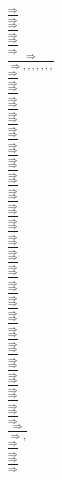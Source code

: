 \documentclass[11pt]{article}
\begin{document}
\begin{center}
\\$\frac{\Rightarrow }{\Rightarrow }$
\bigskip
\\$\frac{\Rightarrow }{\Rightarrow }$
\bigskip
\\$\frac{\Rightarrow }{\Rightarrow }$
\bigskip
\\$\frac{\Rightarrow }{\Rightarrow , , , , , , , }$
\bigskip
\\$\frac{\Rightarrow }{\Rightarrow }$
\bigskip
\\$\frac{\Rightarrow }{\Rightarrow }$
\bigskip
\\$\frac{\Rightarrow }{\Rightarrow }$
\bigskip
\\$\frac{\Rightarrow }{\Rightarrow }$
\bigskip
\\$\frac{\Rightarrow }{\Rightarrow }$
\bigskip
\\$\frac{\Rightarrow }{\Rightarrow }$
\bigskip
\\$\frac{\Rightarrow }{\Rightarrow }$
\bigskip
\\$\frac{\Rightarrow }{\Rightarrow }$
\bigskip
\\$\frac{\Rightarrow }{\Rightarrow }$
\bigskip
\\$\frac{\Rightarrow }{\Rightarrow }$
\bigskip
\\$\frac{\Rightarrow }{\Rightarrow }$
\bigskip
\\$\frac{\Rightarrow }{\Rightarrow }$
\bigskip
\\$\frac{\Rightarrow }{\Rightarrow }$
\bigskip
\\$\frac{\Rightarrow }{\Rightarrow }$
\bigskip
\\$\frac{\Rightarrow }{\Rightarrow }$
\bigskip
\\$\frac{\Rightarrow }{\Rightarrow }$
\bigskip
\\$\frac{\Rightarrow }{\Rightarrow }$
\bigskip
\\$\frac{\Rightarrow }{\Rightarrow }$
\bigskip
\\$\frac{\Rightarrow }{\Rightarrow }$
\bigskip
\\$\frac{\Rightarrow }{\Rightarrow }$
\bigskip
\\$\frac{\Rightarrow }{\Rightarrow }$
\bigskip
\\$\frac{\Rightarrow }{\Rightarrow }$
\bigskip
\\$\frac{\Rightarrow }{\Rightarrow }$
\bigskip
\\$\frac{\Rightarrow }{\Rightarrow , }$
\bigskip
\\$\frac{\Rightarrow }{\Rightarrow }$
\bigskip
\\$\frac{\Rightarrow }{\Rightarrow }$

\end{center}
\end{document}
